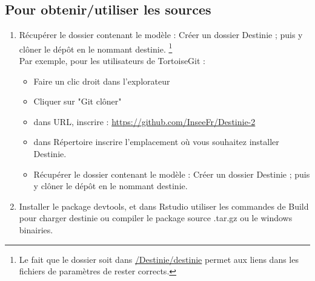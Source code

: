\subsection{Pour obtenir/utiliser les sources}

\begin{enumerate}
\item Récupérer le dossier contenant le modèle : 
Créer un dossier Destinie ; puis y clôner le dépôt en le nommant destinie. \footnote{Le fait que le dossier soit dans \url{/Destinie/destinie} permet aux liens dans les fichiers de paramètres de rester corrects.} \\
Par exemple, pour les utilisateurs de TortoiseGit :
\begin{itemize}
\item Faire un clic droit dans l'explorateur
\item Cliquer sur "Git clôner"
\item  dans URL, inscrire : \url{https://github.com/InseeFr/Destinie-2}
\item dans Répertoire inscrire l'emplacement où vous souhaitez installer Destinie. \item Récupérer le dossier contenant le modèle : 
Créer un dossier Destinie ; puis y clôner le dépôt en le nommant destinie. \\
\end{itemize}
% 
  \item  Installer le package devtools, et dans Rstudio utiliser les commandes de Build pour charger destinie ou compiler le package source .tar.gz ou le windows binairies. 
\end{enumerate}



